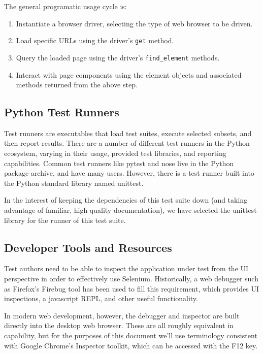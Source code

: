 The general programatic usage cycle is:
\begin{enumerate}
\item Instantiate a browser driver, selecting the type of web browser to be driven.
\item Load specific URLs using the driver's \texttt{get} method.
\item Query the loaded page using the driver's \texttt{find\_element} methods.
\item Interact with page components using the element objects and associated methods returned from the above step.
\end{enumerate}\citep{artzi2011framework}

\subsection{Python Test Runners}
Test runners are executables that load test suites, execute selected subsets, and then report results. There are a number of different test runners in the Python ecosystem, varying in their usage, provided test libraries, and reporting capabilities. \citep{nielsen2014python} Common test runners like pytest and nose live in the Python package archive, and have many users. However, there is a test runner built into the Python standard library named unittest.\citep{pajankar2017python}

In the interest of keeping the dependencies of this test suite down (and taking advantage of familiar, high quality documentation), we have selected the unittest library for the runner of this test suite.

\subsection{Developer Tools and Resources}
Test authors need to be able to inspect the application under test from the UI perspective in order to effectively use Selenium. Historically, a web debugger such as Firefox's Firebug tool has been used to fill this requirement, which provides UI inspections, a javascript REPL, and other useful functionality.\citep{nicholus2016understanding}

In modern web development, however, the debugger and inspector are built directly into the desktop web browser.\citep{odell2014browser} These are all roughly equivalent in capability, but for the purposes of this document we'll use terminology consistent with Google Chrome's Inspector toolkit, which can be accessed with the F12 key.

